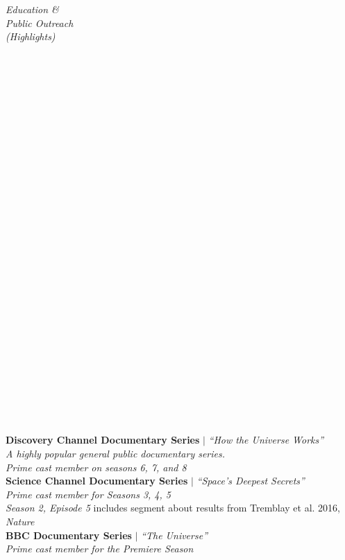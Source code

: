 \documentclass[11pt]{article}
\begin{document}
\hspace{2.5mm} \parbox{1.5in}{\textit{Education \& \\ Public Outreach \\ (Highlights) \\\\\\\\\\\\\\\\\\\\\\\\\\\\\\\\\\\\\\\\\\\\\\\\\\\\\\\\\\}} \parbox{5.15in}{
\textbf{Discovery Channel Documentary Series} $|$ \textit{``How the Universe Works''} \\
\textit{A highly popular general public documentary series. \\Prime cast member on seasons 6, 7, and 8}\\


\textbf{Science Channel Documentary Series} $|$ \textit{``Space's Deepest Secrets''} \\
\textit{Prime cast member for Seasons 3, 4, 5}\\
\textit{Season 2, Episode 5} includes segment about results from Tremblay et al. 2016, \textit{Nature}\\


\textbf{BBC Documentary Series} $|$ \textit{``The Universe''}  \\
\textit{Prime cast member for the Premiere Season}\\


}
\end{document}
